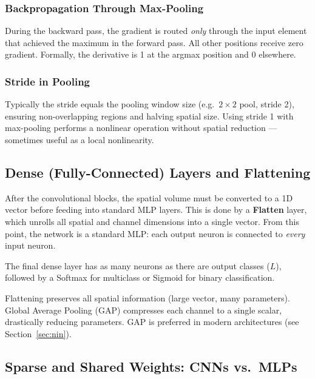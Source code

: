 \documentclass[11pt,a4paper]{article}
\newcommand{\term}[1]{\textcolor{DefGreen}{\textbf{#1}}}
\begin{document}
\subsubsection{Backpropagation Through Max-Pooling}

During the backward pass, the gradient is routed \emph{only} through the input element that achieved the maximum in the forward pass. All other positions receive zero gradient. Formally, the derivative is 1 at the argmax position and 0 elsewhere.

\subsubsection{Stride in Pooling}

Typically the stride equals the pooling window size (e.g.\ $2\times2$ pool, stride 2), ensuring non-overlapping regions and halving spatial size. Using stride 1 with max-pooling performs a nonlinear operation without spatial reduction — sometimes useful as a local nonlinearity.

\subsection{Dense (Fully-Connected) Layers and Flattening}

After the convolutional blocks, the spatial volume must be converted to a 1D vector before feeding into standard MLP layers. This is done by a \term{Flatten} layer, which unrolls all spatial and channel dimensions into a single vector. From this point, the network is a standard MLP: each output neuron is connected to \emph{every} input neuron.

The final dense layer has as many neurons as there are output classes ($L$), followed by a Softmax for multiclass or Sigmoid for binary classification.

\begin{notebox}
Flattening preserves all spatial information (large vector, many parameters). Global Average Pooling (GAP) compresses each channel to a single scalar, drastically reducing parameters. GAP is preferred in modern architectures (see Section~\ref{sec:nin}).
\end{notebox}

\subsection{Sparse and Shared Weights: CNNs vs.\ MLPs}
\label{sec:sparse_shared}
\end{document}
